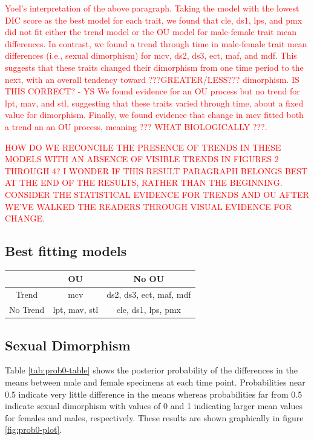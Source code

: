 \documentclass[
  12pt,
]{article}
\begin{document}
\textcolor{red} {
Yoel's interpretation of the above paragraph. Taking the model with the lowest DIC score as the best model for each trait, we found that cle, ds1, lps, and pmx did not fit either the trend model or the OU model for male-female trait mean differences. In contrast, we found a trend through time in male-female trait mean differences (i.e., sexual dimorphism) for mcv, ds2, ds3, ect, maf, and mdf. This suggests that these traits changed their dimorphism from one time period to the next, with an overall tendency toward ???GREATER/LESS??? dimorphism. IS THIS CORRECT? - YS
} \textcolor{red} {
We found evidence for an OU process but no trend for lpt, mav, and stl, suggesting that these traits varied through time, about a fixed value for dimorphism. Finally, we found evidence that change in mcv fitted both a trend an an OU process, meaning ??? WHAT BIOLOGICALLY ???.
}

\textcolor{red} {HOW DO WE RECONCILE THE PRESENCE OF TRENDS IN THESE MODELS WITH AN ABSENCE OF VISIBLE TRENDS IN FIGURES 2 THROUGH 4? I WONDER IF THIS RESULT PARAGRAPH BELONGS BEST AT THE END OF THE RESULTS, RATHER THAN THE BEGINNING. CONSIDER THE STATISTICAL EVIDENCE FOR TRENDS AND OU AFTER WE'VE WALKED THE READERS THROUGH VISUAL EVIDENCE FOR CHANGE.
}

\hypertarget{best-fitting-models}{%
\subsection{Best fitting models}\label{best-fitting-models}}

\begin{table}[ht]
\centering
\begin{tabular}{|c||c|c|}
  \hline
 & OU & No OU  \\ 
  \hline
  \hline
Trend  &  mcv  & ds2, ds3, ect, maf, mdf \\ 
  \hline
  No Trend & lpt, mav, stl  &  cle, ds1, lps, pmx\\
   \hline
\end{tabular}
\label{whichmodel}
\end{table}

\hypertarget{sexual-dimorphism}{%
\subsection{Sexual Dimorphism}\label{sexual-dimorphism}}

Table \ref{tab:prob0-table} shows the posterior probability of the
differences in the means between male and female specimens at each time
point. Probabilities near 0.5 indicate very little difference in the
means whereas probabilities far from 0.5 indicate sexual dimorphism with
values of 0 and 1 indicating larger mean values for females and males,
respectively. These results are shown graphically in figure
\ref{fig:prob0-plot}.
\end{document}
